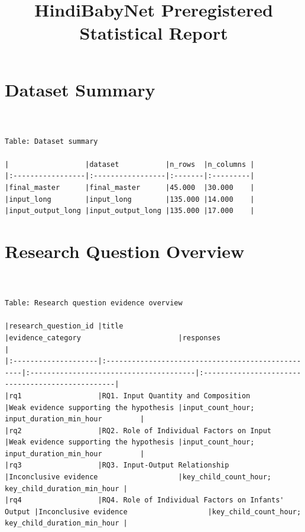 \documentclass[
  letterpaper,
  DIV=11,
  numbers=noendperiod]{scrartcl}
\title{HindiBabyNet Preregistered Statistical Report}
\author{}
\date{}
\begin{document}
\maketitle
\ifdefined\Shaded\renewenvironment{Shaded}{\begin{tcolorbox}[sharp corners, boxrule=0pt, enhanced, borderline west={3pt}{0pt}{shadecolor}, breakable, interior hidden, frame hidden]}{\end{tcolorbox}}\fi

\hypertarget{dataset-summary}{%
\section{Dataset Summary}\label{dataset-summary}}

\begin{verbatim}


Table: Dataset summary

|                  |dataset           |n_rows  |n_columns |
|:-----------------|:-----------------|:-------|:---------|
|final_master      |final_master      |45.000  |30.000    |
|input_long        |input_long        |135.000 |14.000    |
|input_output_long |input_output_long |135.000 |17.000    |
\end{verbatim}

\hypertarget{research-question-overview}{%
\section{Research Question Overview}\label{research-question-overview}}

\begin{verbatim}


Table: Research question evidence overview

|research_question_id |title                                              |evidence_category                       |responses                                         |
|:--------------------|:--------------------------------------------------|:---------------------------------------|:-------------------------------------------------|
|rq1                  |RQ1. Input Quantity and Composition                |Weak evidence supporting the hypothesis |input_count_hour; input_duration_min_hour         |
|rq2                  |RQ2. Role of Individual Factors on Input           |Weak evidence supporting the hypothesis |input_count_hour; input_duration_min_hour         |
|rq3                  |RQ3. Input-Output Relationship                     |Inconclusive evidence                   |key_child_count_hour; key_child_duration_min_hour |
|rq4                  |RQ4. Role of Individual Factors on Infants' Output |Inconclusive evidence                   |key_child_count_hour; key_child_duration_min_hour |
\end{verbatim}
\end{document}
